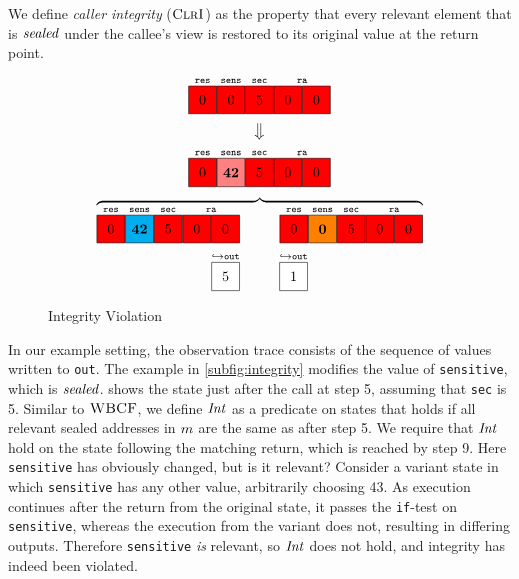 \documentclass[10pt,conference]{ieeetran}%
\theoremstyle{definition}
\begin{document}
We define \emph{caller integrity} (\(\textnormal{\sc ClrI}\))  as the property that
every relevant element that is \(\mathit{sealed}\) under the callee's view is restored
to its original value at the return point.

\newcommand{\figfourbox}[1][]{\genbox{20px}{red}{#1}}

\begin{figure}
  \centering
  \[
  \stackrel{\texttt{res}}{\figfourbox[0]}
  \stackrel{\texttt{sens}}{\figfourbox[0]}
  \stackrel{\texttt{sec}}{\figfourbox[5]}
  \stackrel{\texttt{ra}}{\figfourbox[0]\figfourbox[0]}\]
  \[\big\Downarrow\]
  \[
  \stackrel{\texttt{res}}{\figfourbox[0]}
  \stackrel{\texttt{sens}}{\genbox{20px}{red!50}{\bf 42}}
  \stackrel{\texttt{sec}}{\figfourbox[5]}
  \stackrel{\texttt{ra}}{\figfourbox[0]\figfourbox[0]}\]
  \[\overbrace{
    \stackrel{\texttt{res}}{\figfourbox[0]}
    \stackrel{\texttt{sens}}{\genbox{20px}{\leftvariant}{\bf 42}}
    \stackrel{\texttt{sec}}{\figfourbox[5]}
    \stackrel{\texttt{ra}}{\figfourbox[0]\figfourbox[0]}
    \hspace{1cm}
    \stackrel{\texttt{res}}{\figfourbox[0]}
    \stackrel{\texttt{sens}}{\genbox{20px}{\rightvariant}{\bf 0}}
    \stackrel{\texttt{sec}}{\figfourbox[5]}
    \stackrel{\texttt{ra}}{\figfourbox[0]\figfourbox[0]}}\]
  \[\stackrel{\hookrightarrow \mathtt{out}}{\genbox{20px}{white}{5}} \hspace{0.5cm}
  \hspace{0.5cm}
  \stackrel{\hookrightarrow \mathtt{out}}{\genbox{20px}{white}{1}}\]
  \caption{Integrity Violation}
  \label{fig:variant}
\end{figure}

In our example setting, the observation trace consists of the sequence
of values written to {\tt out}.
The example in \cref{subfig:integrity} modifies the value of {\tt sensitive},
which is \(\mathit{sealed}\).  shows the state just after the call at step 5,
assuming that {\tt sec} is 5. Similar to \(\textnormal{\sc WBCF}\), we define
\(\mathit{Int}\) as a predicate on states that holds if
all relevant sealed addresses in \(m\) are the same as after step 5.
We require that \(\mathit{Int}\) hold on the state following the matching return,
which is reached by step 9. Here {\tt sensitive} has obviously changed, but is it relevant?
Consider a variant state in which {\tt sensitive} has any other value, arbitrarily
choosing 43. As execution continues after the return
from the original state, it passes the {\tt if}-test on {\tt sensitive}, whereas the execution
from the variant does not, resulting in differing outputs. Therefore {\tt sensitive} \emph{is} relevant,
so \(\mathit{Int}\) does not hold, and integrity has indeed been violated.
\end{document}
